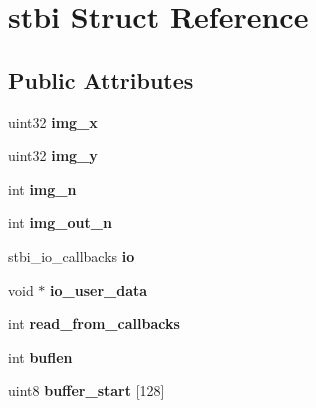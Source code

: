 \hypertarget{structstbi}{}\section{stbi Struct Reference}
\label{structstbi}
\subsection*{Public Attributes}
\begin{DoxyCompactItemize}
\item 
\hypertarget{structstbi_af3b42c257fb0d8896f29ca3921540a42}{}uint32 {\bfseries img\+\_\+x}\label{structstbi_af3b42c257fb0d8896f29ca3921540a42}

\item 
\hypertarget{structstbi_a60cb5a630e268b2d12306c6eca246dd1}{}uint32 {\bfseries img\+\_\+y}\label{structstbi_a60cb5a630e268b2d12306c6eca246dd1}

\item 
\hypertarget{structstbi_ae22cfcc23f5ab67bede22942333ecbd7}{}int {\bfseries img\+\_\+n}\label{structstbi_ae22cfcc23f5ab67bede22942333ecbd7}

\item 
\hypertarget{structstbi_a33f6519d8f99b84afbde795dc7a931f2}{}int {\bfseries img\+\_\+out\+\_\+n}\label{structstbi_a33f6519d8f99b84afbde795dc7a931f2}

\item 
\hypertarget{structstbi_a86596e1eb2b0f57a60a18777bd37ff53}{}stbi\+\_\+io\+\_\+callbacks {\bfseries io}\label{structstbi_a86596e1eb2b0f57a60a18777bd37ff53}

\item 
\hypertarget{structstbi_a9838a0c89630f283c25a16f4e30f40aa}{}void $\ast$ {\bfseries io\+\_\+user\+\_\+data}\label{structstbi_a9838a0c89630f283c25a16f4e30f40aa}

\item 
\hypertarget{structstbi_acb201cc1b3eb134f342cee89f5d11e70}{}int {\bfseries read\+\_\+from\+\_\+callbacks}\label{structstbi_acb201cc1b3eb134f342cee89f5d11e70}

\item 
\hypertarget{structstbi_a76d6f761529ecff7f02469b19371af0e}{}int {\bfseries buflen}\label{structstbi_a76d6f761529ecff7f02469b19371af0e}

\item 
\hypertarget{structstbi_af99edda496281a6ca1b58271cabdbc69}{}uint8 {\bfseries buffer\+\_\+start} \mbox{[}128\mbox{]}\label{structstbi_af99edda496281a6ca1b58271cabdbc69}


\end{DoxyCompactItemize}

